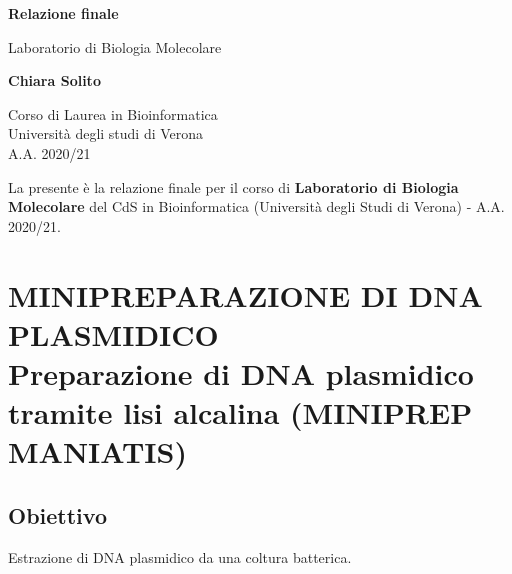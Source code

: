 \documentclass{extarticle}
\begin{document}
\begin{titlepage}
    \begin{center}
        \vspace*{1cm}
            
        \Huge
        \textbf{Relazione finale}
            
        \vspace{0.5cm}
        \LARGE
        Laboratorio di Biologia Molecolare
            
        \vspace{1.5cm}
            
        \textbf{Chiara Solito}

        \vspace{0.8cm}

            
        \Large
        Corso di Laurea in Bioinformatica\\
        Università degli studi di Verona\\
        A.A. 2020/21
            
    \end{center}
\end{titlepage}
\newcommand\tab[1][0.3cm]{\hspace*{#1}}

\newpage
La presente è la relazione finale per il corso di \textbf{Laboratorio di Biologia Molecolare} del CdS in Bioinformatica (Università degli Studi di Verona) - A.A. 2020/21.
\tableofcontents
\newpage 
\section[MINIPREPARAZIONE DI DNA PLASMIDICO.\\Preparazione di DNA plasmidico tramite lisi alcalina]{MINIPREPARAZIONE DI DNA PLASMIDICO\\ {\large Preparazione di DNA plasmidico tramite lisi alcalina
(MINIPREP MANIATIS)}}
\subsection*{Obiettivo} Estrazione di DNA plasmidico da una coltura batterica.
\end{document}

